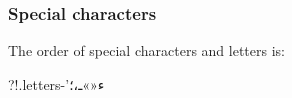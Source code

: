 \subsubsection{Special characters}
The order of special characters and letters is:
\begin{flushleft}
?\hspace{4mm}!\hspace{4mm}.\hspace{4mm}letters\hspace{4mm}-\hspace{4mm}'\hspace{4mm}{\hspace{4mm}}\hspace{4mm}ّ\hspace{4mm}َ\hspace{4mm}ِ\hspace{4mm}ُ\hspace{4mm}ً\hspace{4mm}ٍ\hspace{4mm}ٌ\hspace{4mm}ْ\hspace{4mm}ٔ\hspace{4mm}ء\hspace{4mm}‌\hspace{4mm}«\hspace{4mm}»\hspace{4mm}ـ\hspace{4mm}،\hspace{4mm}؛
\end{flushleft}
\newpage
